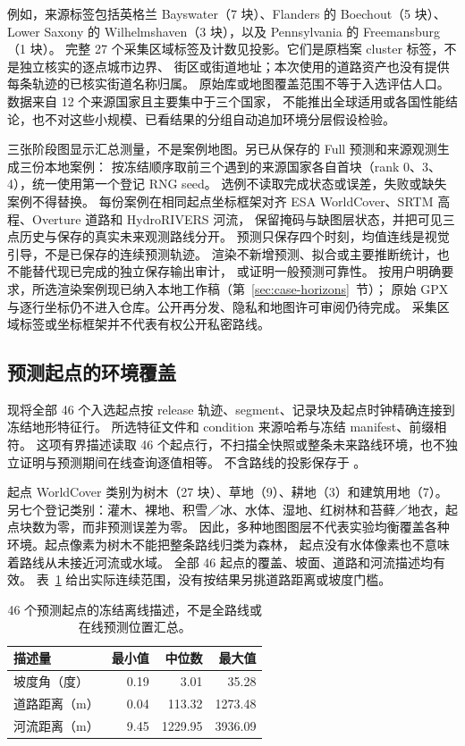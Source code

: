 \documentclass[UTF8,11pt]{ctexart}
\begin{document}
例如，来源标签包括英格兰 Bayswater（7 块）、Flanders 的 Boechout（5 块）、
Lower Saxony 的 Wilhelmshaven（3 块），以及 Pennsylvania 的 Freemansburg（1 块）。
完整 27 个采集区域标签及计数见投影。它们是原档案 cluster 标签，不是独立核实的逐点城市边界、
街区或街道地址；本次使用的道路资产也没有提供每条轨迹的已核实街道名称归属。
原始库或地图覆盖范围不等于入选评估人口。数据来自 12 个来源国家且主要集中于三个国家，
不能推出全球适用或各国性能结论，也不对这些小规模、已看结果的分组自动追加环境分层假设检验。

三张阶段图显示汇总测量，不是案例地图。另已从保存的 Full 预测和来源观测生成三份本地案例：
按冻结顺序取前三个遇到的来源国家各自首块（rank 0、3、4），统一使用第一个登记 RNG seed。
选例不读取完成状态或误差，失败或缺失案例不得替换。
每份案例在相同起点坐标框架对齐 ESA WorldCover、SRTM 高程、Overture 道路和 HydroRIVERS 河流，
保留掩码与缺图层状态，并把可见三点历史与保存的真实未来观测路线分开。
预测只保存四个时刻，均值连线是视觉引导，不是已保存的连续预测轨迹。
渲染不新增预测、拟合或主要推断统计，也不能替代现已完成的独立保存输出审计，
或证明一般预测可靠性。
按用户明确要求，所选渲染案例现已纳入本地工作稿（第~\ref{sec:case-horizons}~节）；
原始 GPX 与逐行坐标仍不进入仓库。公开再分发、隐私和地图许可审阅仍待完成。
采集区域标签或坐标框架并不代表有权公开私密路线。

\subsection{预测起点的环境覆盖}
\label{sec:origin-environment}
现将全部 46 个入选起点按 release 轨迹、segment、记录块及起点时钟精确连接到冻结地形特征行。
所选特征文件和 condition 来源哈希与冻结 manifest、前缀相符。
这项有界描述读取 46 个起点行，不扫描全快照或整条未来路线环境，也不独立证明与预测期间在线查询逐值相等。
不含路线的投影保存于 。

起点 WorldCover 类别为树木（27 块）、草地（9）、耕地（3）和建筑用地（7）。
另七个登记类别：灌木、裸地、积雪／冰、水体、湿地、红树林和苔藓／地衣，起点块数为零，而非预测误差为零。
因此，多种地图图层不代表实验均衡覆盖各种环境。起点像素为树木不能把整条路线归类为森林，
起点没有水体像素也不意味着路线从未接近河流或水域。
全部 46 起点的覆盖、坡面、道路和河流描述均有效。
表~\ref{tab:origin-environment-range} 给出实际连续范围，没有按结果另挑道路距离或坡度门槛。

\begin{table}[htbp]
\centering\small
\caption{46 个预测起点的冻结离线描述，不是全路线或在线预测位置汇总。}
\label{tab:origin-environment-range}
\begin{tabular}{lrrr}
\toprule
描述量 & 最小值 & 中位数 & 最大值\\
\midrule
坡度角（度） & 0.19 & 3.01 & 35.28\\
道路距离（m） & 0.04 & 113.32 & 1273.48\\
河流距离（m） & 9.45 & 1229.95 & 3936.09\\
\bottomrule
\end{tabular}
\end{table}
\end{document}
